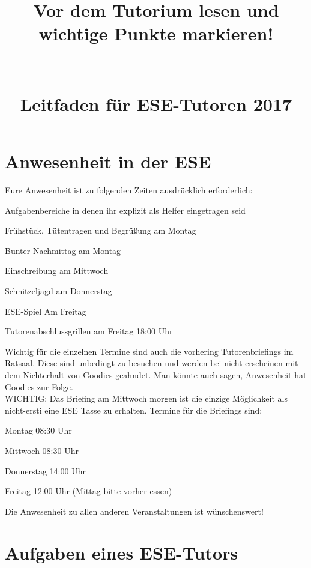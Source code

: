 \documentclass[a4paper,12pt]{report}
\begin{document}
\title{\huge{\textbf{Vor dem Tutorium lesen und wichtige Punkte markieren!}}\\\ \\\ \\{Leitfaden für ESE-Tutoren 2017}}
\date{}
\author{}
\maketitle

\section*{Anwesenheit in der ESE}
Eure Anwesenheit ist zu folgenden Zeiten ausdrücklich erforderlich:
\begin{itemize*}
    \item Aufgabenbereiche in denen ihr explizit als Helfer eingetragen seid
    \item Frühstück, Tütentragen und Begrüßung am Montag
    \item Bunter Nachmittag am Montag
    \item Einschreibung am Mittwoch
    \item Schnitzeljagd am Donnerstag
    \item ESE-Spiel Am Freitag
    \item Tutorenabschlussgrillen am Freitag 18:00 Uhr
\end{itemize*}
Wichtig für die einzelnen Termine sind auch die vorhering Tutorenbriefings im Ratsaal. Diese sind unbedingt zu besuchen und werden bei nicht erscheinen mit dem Nichterhalt von Goodies geahndet. Man könnte auch sagen, Anwesenheit hat Goodies zur Folge.\\
WICHTIG: Das Briefing am Mittwoch morgen ist die einzige Möglichkeit als nicht-ersti eine ESE Tasse zu erhalten.
Termine für die Briefings sind:
\begin{itemize*}
    \item Montag        08:30 Uhr
    \item Mittwoch      08:30 Uhr
    \item Donnerstag    14:00 Uhr
    \item Freitag       12:00 Uhr (Mittag bitte vorher essen)
\end{itemize*}

Die Anwesenheit zu allen anderen Veranstaltungen ist wünschenswert!

\section*{Aufgaben eines ESE-Tutors}
\end{document}
